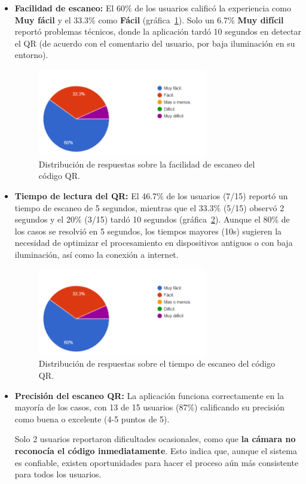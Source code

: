 \begin{itemize}
	\item \textbf{Facilidad de escaneo:} 
	El 60\% de los usuarios calificó la experiencia como \textbf{Muy fácil} y el 33.3\% como \textbf{Fácil} (gráfica~\ref{fig:facilidad-escaneo}). 
	Solo un 6.7\% \textbf{Muy difícil} reportó problemas técnicos, donde la aplicación tardó 10 segundos en detectar el QR (de acuerdo con el comentario del usuario, por baja iluminación en su entorno).
	
	\begin{figure}
		\centering
		\includegraphics[width=0.7\textwidth]{images/grafico_escaneo.png}
		\caption{Distribución de respuestas sobre la facilidad de escaneo del código QR.}
		\label{fig:facilidad-escaneo}
	\end{figure}
	
	\item \textbf{Tiempo de lectura del QR:}  
	El 46.7\% de los usuarios (7/15) reportó un tiempo de escaneo de 5 segundos, mientras que el 33.3\% (5/15) observó 2 segundos y el 20\% (3/15) tardó 10 segundos (gráfica~\ref{fig:tiempo-escaneo}).  
	Aunque el 80\% de los casos se resolvió en 5 segundos, los tiempos mayores (10s) sugieren la necesidad de optimizar el procesamiento en dispositivos antiguos o con baja iluminación, así como la conexión a internet.
	
	\begin{figure}
		\centering
		\includegraphics[width=0.7\textwidth]{images/grafico_escaneo.png}
		\caption{Distribución de respuestas sobre el tiempo de escaneo del código QR.}
		\label{fig:tiempo-escaneo}
	\end{figure}
	
	\item \textbf{Precisión del escaneo QR:} 
	La aplicación funciona correctamente en la mayoría de los casos, con 13 de 15 usuarios (87\%) calificando su precisión como buena o excelente (4-5 puntos de 5). 
	
	Solo 2 usuarios reportaron dificultades ocasionales, como que \textbf{la cámara no reconocía el código inmediatamente}. Esto indica que, aunque el sistema es confiable, existen oportunidades para hacer el proceso aún más consistente para todos los usuarios.
\end{itemize}

